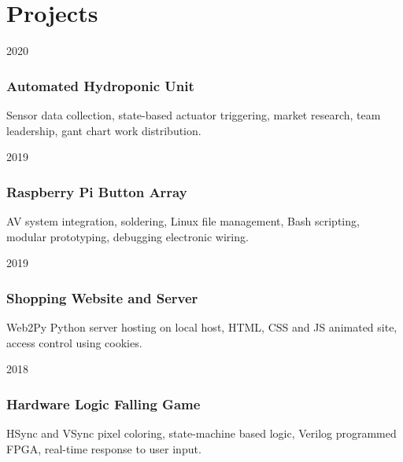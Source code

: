 \documentclass[12pt,letterpaper]{report}
\newcommand{\verticalgap}{2em}
\newcommand{\projectspace}{.75em}
\newcommand{\topandbottom}{\linewidth}
\begin{document}
	\begin{minipage}[t]{\topandbottom}
		\vspace{\verticalgap}
	\section*{Projects}
    \begin{tablist}
	\raggedright
	\item[2020] \tab \subsubsection*{Automated Hydroponic Unit}\hspace{\projectspace}Sensor data collection, state-based actuator triggering, market research, team leadership, gant chart work distribution.
    \item[2019] \tab \subsubsection*{Raspberry Pi Button Array}\hspace{\projectspace}AV system integration, soldering, Linux file management, \newline Bash scripting, modular prototyping, debugging electronic wiring.
    \item[2019] \tab \subsubsection*{Shopping Website and Server}\hspace{\projectspace}Web2Py Python server hosting on local host, HTML, CSS and JS animated site, access control using cookies.
    \item[2018] \tab \subsubsection*{Hardware Logic Falling Game}\hspace{\projectspace}HSync and VSync pixel coloring, state-machine based logic, Verilog programmed FPGA, real-time response to user input.
	\end{tablist}
	\end{minipage}
	
\end{document}
